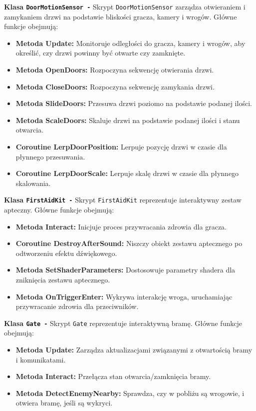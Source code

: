 \textbf{Klasa \texttt{DoorMotionSensor -}}
Skrypt \texttt{DoorMotionSensor} zarządza otwieraniem i zamykaniem drzwi na podstawie bliskości gracza, kamery i wrogów. Główne funkcje obejmują:
\begin{itemize}
  \item \textbf{Metoda Update:} Monitoruje odległości do gracza, kamery i wrogów, aby określić, czy drzwi powinny być otwarte czy zamknięte.
  \item \textbf{Metoda OpenDoors:} Rozpoczyna sekwencję otwierania drzwi.
  \item \textbf{Metoda CloseDoors:} Rozpoczyna sekwencję zamykania drzwi.
  \item \textbf{Metoda SlideDoors:} Przesuwa drzwi poziomo na podstawie podanej ilości.
  \item \textbf{Metoda ScaleDoors:} Skaluje drzwi na podstawie podanej ilości i stanu otwarcia.
  \item \textbf{Coroutine LerpDoorPosition:} Lerpuje pozycję drzwi w czasie dla płynnego przesuwania.
  \item \textbf{Coroutine LerpDoorScale:} Lerpuje skalę drzwi w czasie dla płynnego skalowania.
\end{itemize}

\textbf{Klasa \texttt{FirstAidKit -}}
Skrypt \texttt{FirstAidKit} reprezentuje interaktywny zestaw apteczny. Główne funkcje obejmują:
\begin{itemize}
  \item \textbf{Metoda Interact:} Inicjuje proces przywracania zdrowia dla gracza.
  \item \textbf{Coroutine DestroyAfterSound:} Niszczy obiekt zestawu aptecznego po odtworzeniu efektu dźwiękowego.
  \item \textbf{Metoda SetShaderParameters:} Dostosowuje parametry shadera dla zniknięcia zestawu aptecznego.
  \item \textbf{Metoda OnTriggerEnter:} Wykrywa interakcję wroga, uruchamiając przywracanie zdrowia dla przeciwników.
\end{itemize}

\textbf{Klasa \texttt{Gate -}}
Skrypt \texttt{Gate} reprezentuje interaktywną bramę. Główne funkcje obejmują:
\begin{itemize}
  \item \textbf{Metoda Update:} Zarządza aktualizacjami związanymi z otwartością bramy i komunikatami.
  \item \textbf{Metoda Interact:} Przełącza stan otwarcia/zamknięcia bramy.
  \item \textbf{Metoda DetectEnemyNearby:} Sprawdza, czy w pobliżu są wrogowie, i otwiera bramę, jeśli są wykryci.
\end{itemize}

